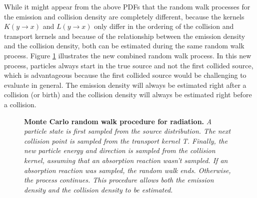 While it might appear from the above PDFs that the random walk processes for
the emission and collision density are completely different, because the kernels
$K(y \to x)$ and $L(y \to x)$ only differ in the ordering of the collision and 
transport kernels and because of the relationship between the emission density 
and the collision density, both can be estimated during the same random walk 
process. Figure \ref{fig:combined_random_walk_process} illustrates the new 
combined random walk process. In this new process, particles always start in 
the true source and not the first collided source, which is advantageous 
because the first collided source would be challenging to 
evaluate in general. The emission density will always be estimated right after 
a collision (or birth) and the collision density will always be estimated right 
before a collision. 
\begin{figure}[t!]
  \begin{center}
    \end{center}
  \caption{\textbf{Monte Carlo random walk procedure for radiation.}
    \textit{A particle state is first sampled from the source distribution. The
      next collision point is sampled from the transport kernel T. Finally,
      the new particle energy and direction is sampled from the collision
      kernel, assuming that an absorption reaction wasn't sampled. If an
      absorption reaction was sampled, the random walk ends. Otherwise, the
      process continues. This procedure allows both the emission density and 
      the collision density to be estimated.}}
  \label{fig:combined_random_walk_process}
\end{figure}

